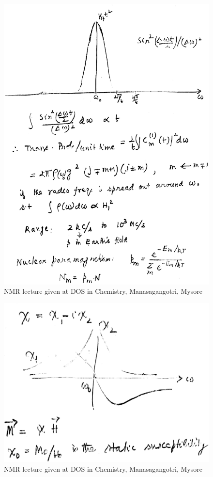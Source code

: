 \begin{figure}[H]
\centering
\includegraphics[scale=0.48]{src/images/chap8/6.eps}
\caption{NMR lecture given at DOS in Chemistry, Manasagangotri, Mysore}
\end{figure}
\begin{figure}[H]
\centering
\includegraphics[scale=0.26]{src/images/chap8/7.eps}
\caption{NMR lecture given at DOS in Chemistry, Manasagangotri, Mysore}
\end{figure}
